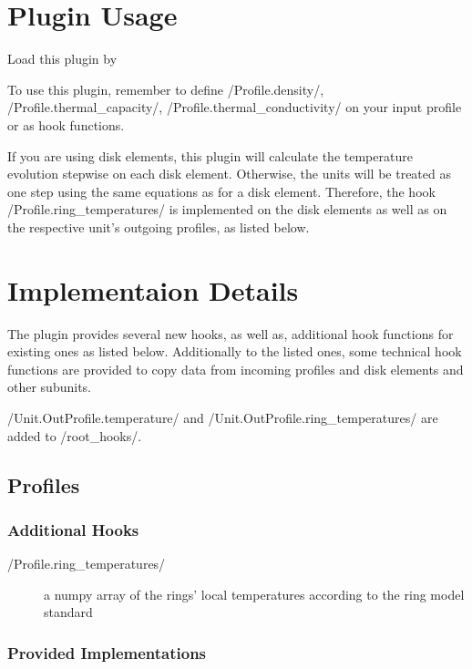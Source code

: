 \documentclass{PyRollDocs}
\begin{document}
    \section{Plugin Usage}\label{sec:plugin-usage}

    Load this plugin by


    To use this plugin, remember to define \py/Profile.density/, \py/Profile.thermal_capacity/, \py/Profile.thermal_conductivity/ on your input profile or as hook functions.

    If you are using disk elements, this plugin will calculate the temperature evolution stepwise on each disk element.
    Otherwise, the units will be treated as one step using the same equations as for a disk element.
    Therefore, the hook \py/Profile.ring_temperatures/ is implemented on the disk elements as well as on the respective unit's outgoing profiles, as listed below.


    \section{Implementaion Details}

    The plugin provides several new hooks, as well as, additional hook functions for existing ones as listed below.
    Additionally to the listed ones, some technical hook functions are provided to copy data from incoming profiles and disk elements and other subunits.

    \py/Unit.OutProfile.temperature/ and \py/Unit.OutProfile.ring_temperatures/ are added to \py/root_hooks/.

    \subsection{Profiles}

    \subsubsection{Additional Hooks}

    \begin{description}
        \item[\py/Profile.ring_temperatures/] a numpy array of the rings' local temperatures according to the ring model standard
    \end{description}

    \subsubsection{Provided Implementations}
\end{document}
